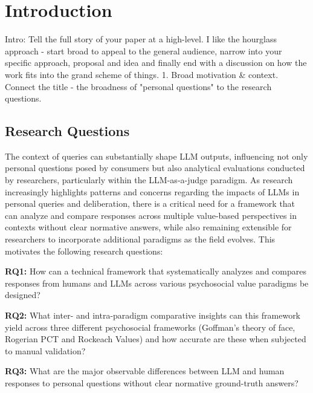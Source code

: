 \section{Introduction}
\textcolor{black!30}{Intro: Tell the full story of your paper at a high-level. I like the hourglass approach - start broad to appeal to the general audience, narrow into your specific approach, proposal and idea and finally end with a discussion on how the work fits into the grand scheme of things. 1. Broad motivation \& context. Connect the title - the broadness of "personal questions" to the research questions.}

\textcolor{black!30}{\lipsum[1-4]}


\subsection{Research Questions}\label{sec:RQs}
The context of queries can substantially shape LLM outputs, influencing not only personal questions posed by consumers but also analytical evaluations conducted by researchers, particularly within the LLM-as-a-judge paradigm. As research increasingly highlights patterns and concerns regarding the impacts of LLMs in personal queries and deliberation, there is a critical need for a framework that can analyze and compare responses across multiple value-based perspectives in contexts without clear normative answers, while also remaining extensible for researchers to incorporate additional paradigms as the field evolves. This motivates the following research questions: 

\medskip\textbf{RQ1:} How can a technical framework that systematically analyzes and compares responses from humans and LLMs across various psychosocial value paradigms be designed?  

\medskip\textbf{RQ2:} What inter- and intra-paradigm comparative insights can this framework yield across three different psychosocial frameworks (Goffman’s theory of face, Rogerian PCT and Rockeach Values) and how accurate are these when subjected to manual validation?

\medskip\textbf{RQ3:} What are the major observable differences between LLM and human responses to personal questions without clear normative ground-truth answers? 

